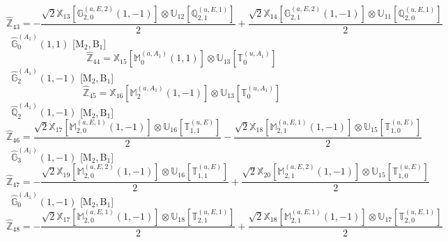\documentclass[fleqn,10pt,landscape]{article}
\begin{document}
\begin{itemize}
\begin{dmath*}
\hat{\mathbb{Z}}_{43}=- \frac{\sqrt{2} \mathbb{X}_{13}[\mathbb{G}_{2,0}^{(a,E,2)}(1,-1)] \otimes\mathbb{U}_{12}[\mathbb{Q}_{2,1}^{(u,E,1)}]}{2} + \frac{\sqrt{2} \mathbb{X}_{14}[\mathbb{G}_{2,1}^{(a,E,2)}(1,-1)] \otimes\mathbb{U}_{11}[\mathbb{Q}_{2,0}^{(u,E,1)}]}{2}
\end{dmath*}
\vspace{4mm}
\noindent {} $\,\,\,\hat{\mathbb{G}}_{0}^{(A_{1})}(1,1)$ [M$_{2}$,\,B$_{1}$]
\begin{dmath*}
\hat{\mathbb{Z}}_{44}=\mathbb{X}_{15}[\mathbb{M}_{0}^{(a,A_{1})}(1,1)] \otimes\mathbb{U}_{13}[\mathbb{T}_{0}^{(u,A_{1})}]
\end{dmath*}
\vspace{4mm}
\noindent {} $\,\,\,\hat{\mathbb{G}}_{2}^{(A_{1})}(1,-1)$ [M$_{2}$,\,B$_{1}$]
\begin{dmath*}
\hat{\mathbb{Z}}_{45}=\mathbb{X}_{16}[\mathbb{M}_{2}^{(a,A_{1})}(1,-1)] \otimes\mathbb{U}_{13}[\mathbb{T}_{0}^{(u,A_{1})}]
\end{dmath*}
\vspace{4mm}
\noindent {} $\,\,\,\hat{\mathbb{Q}}_{2}^{(A_{1})}(1,-1)$ [M$_{2}$,\,B$_{1}$]
\begin{dmath*}
\hat{\mathbb{Z}}_{46}=\frac{\sqrt{2} \mathbb{X}_{17}[\mathbb{M}_{2,0}^{(a,E,1)}(1,-1)] \otimes\mathbb{U}_{16}[\mathbb{T}_{1,1}^{(u,E)}]}{2} - \frac{\sqrt{2} \mathbb{X}_{18}[\mathbb{M}_{2,1}^{(a,E,1)}(1,-1)] \otimes\mathbb{U}_{15}[\mathbb{T}_{1,0}^{(u,E)}]}{2}
\end{dmath*}
\vspace{4mm}
\noindent {} $\,\,\,\hat{\mathbb{G}}_{3}^{(A_{1})}(1,-1)$ [M$_{2}$,\,B$_{1}$]
\begin{dmath*}
\hat{\mathbb{Z}}_{47}=- \frac{\sqrt{2} \mathbb{X}_{19}[\mathbb{M}_{2,0}^{(a,E,2)}(1,-1)] \otimes\mathbb{U}_{16}[\mathbb{T}_{1,1}^{(u,E)}]}{2} + \frac{\sqrt{2} \mathbb{X}_{20}[\mathbb{M}_{2,1}^{(a,E,2)}(1,-1)] \otimes\mathbb{U}_{15}[\mathbb{T}_{1,0}^{(u,E)}]}{2}
\end{dmath*}
\vspace{4mm}
\noindent {} $\,\,\,\hat{\mathbb{G}}_{0}^{(A_{1})}(1,-1)$ [M$_{2}$,\,B$_{1}$]
\begin{dmath*}
\hat{\mathbb{Z}}_{48}=- \frac{\sqrt{2} \mathbb{X}_{17}[\mathbb{M}_{2,0}^{(a,E,1)}(1,-1)] \otimes\mathbb{U}_{18}[\mathbb{T}_{2,1}^{(u,E,1)}]}{2} + \frac{\sqrt{2} \mathbb{X}_{18}[\mathbb{M}_{2,1}^{(a,E,1)}(1,-1)] \otimes\mathbb{U}_{17}[\mathbb{T}_{2,0}^{(u,E,1)}]}{2}

\end{dmath*}
\end{itemize}
\end{document}
